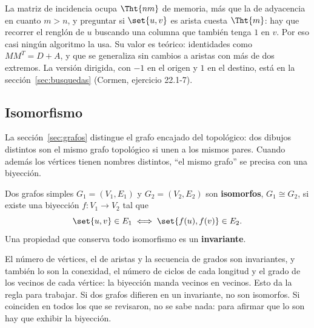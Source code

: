 \documentclass[11pt,letterpaper]{article}
\begin{document}
\begin{idea}
  La matriz de incidencia ocupa $\Tht{nm}$ de memoria, más que la de
  adyacencia en cuanto $m > n$, y preguntar si $\set{u, v}$ es arista
  cuesta $\Tht{m}$: hay que recorrer el renglón de $u$ buscando una
  columna que también tenga $1$ en $v$. Por eso casi ningún algoritmo
  la usa. Su valor es teórico: identidades como $M M^{T} = D + A$, y
  que se generaliza sin cambios a aristas con más de dos extremos. La
  versión dirigida, con $-1$ en el origen y $1$ en el destino, está en
  la sección~\ref{sec:busquedas} (Cormen, ejercicio 22.1-7).
\end{idea}


\subsection*{Isomorfismo}

La sección~\ref{sec:grafos} distingue el grafo encajado del
topológico: dos dibujos distintos son el mismo grafo topológico si unen
a los mismos pares. Cuando además los vértices tienen nombres
distintos, ``el mismo grafo'' se precisa con una biyección.

\begin{definicion}[Isomorfismo]
  \label{def:isomorfismo}
  Dos grafos simples $G_1 = (V_1, E_1)$ y $G_2 = (V_2, E_2)$ son
  \textbf{isomorfos}, $G_1 \cong G_2$, si existe una biyección
  $f : V_1 \to V_2$ tal que
  \[
    \set{u, v} \in E_1 \iff \set{f(u), f(v)} \in E_2 .
  \]
  Una propiedad que conserva todo isomorfismo es un
  \textbf{invariante}.
\end{definicion}

El número de vértices, el de aristas y la secuencia de grados son
invariantes, y también lo son la conexidad, el número de ciclos de
cada longitud y el grado de los vecinos de cada vértice: la biyección
manda vecinos en vecinos. Esto da la regla para trabajar. Si dos grafos
difieren en un invariante, no son isomorfos. Si coinciden en todos los
que se revisaron, no se sabe nada: para afirmar que lo son hay que
exhibir la biyección.
\end{document}

